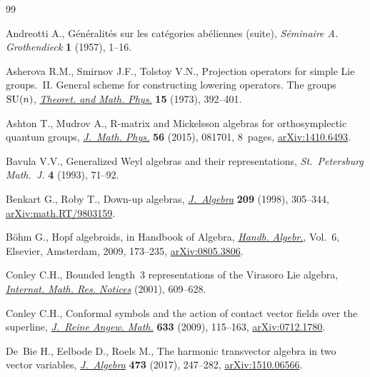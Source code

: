 \documentclass[10pt,a4paper]{amsart}
\numberwithin{equation}{section}
\begin{document}
\begin{thebibliography}{99}
\footnotesize\itemsep=0pt

Andreotti A., G\'en\'eralit\'es sur les cat\'egories ab\'eliennes (suite),
 \textit{S\'eminaire A. Grothendieck} \textbf{1} (1957), 1--16.

Asherova R.M., Smirnov J.F., Tolstoy V.N., Projection operators for simple
 {L}ie groups.~{II}. {G}eneral scheme for constructing lowering operators.
 {T}he groups~{${\rm SU}(n)$}, \href{https://doi.org/10.1007/BF01028268}{\textit{Theoret. and Math. Phys.}} \textbf{15}
 (1973), 392--401.

Ashton T., Mudrov A., R-matrix and {M}ickelsson algebras for orthosymplectic
 quantum groups, \href{https://doi.org/10.1063/1.4927582}{\textit{J.~Math. Phys.}} \textbf{56} (2015), 081701, 8~pages,
 \href{https://arxiv.org/abs/1410.6493}{arXiv:1410.6493}.

Bavula V.V., Generalized {W}eyl algebras and their representations,
 \textit{St.~Petersburg Math.~J.} \textbf{4} (1993), 71--92.

Benkart G., Roby T., Down-up algebras, \href{https://doi.org/10.1006/jabr.1998.7511}{\textit{J.~Algebra}} \textbf{209} (1998),
 305--344, \href{https://arxiv.org/abs/math.RT/9803159}{arXiv:math.RT/9803159}.

B\"ohm G., Hopf algebroids, in Handbook of {A}lgebra, \href{https://doi.org/10.1016/S1570-7954(08)00205-2}{\textit{Handb. Algebr.}},
 Vol.~6, Elsevier, Amsterdam, 2009, 173--235, \href{https://arxiv.org/abs/0805.3806}{arXiv:0805.3806}.

Conley C.H., Bounded length~3 representations of the {V}irasoro {L}ie algebra,
 \href{https://doi.org/10.1155/S1073792801000320}{\textit{Internat. Math. Res. Notices}} (2001), 609--628.

Conley C.H., Conformal symbols and the action of contact vector fields over the
 superline, \href{https://doi.org/10.1515/CRELLE.2009.062}{\textit{J.~Reine Angew. Math.}} \textbf{633} (2009), 115--163,
 \href{https://arxiv.org/abs/0712.1780}{arXiv:0712.1780}.

De~Bie H., Eelbode D., Roels M., The harmonic transvector algebra in two vector
 variables, \href{https://doi.org/10.1016/j.jalgebra.2016.10.039}{\textit{J.~Algebra}} \textbf{473} (2017), 247--282,
 \href{https://arxiv.org/abs/1510.06566}{arXiv:1510.06566}.


\end{thebibliography}
\end{document}
